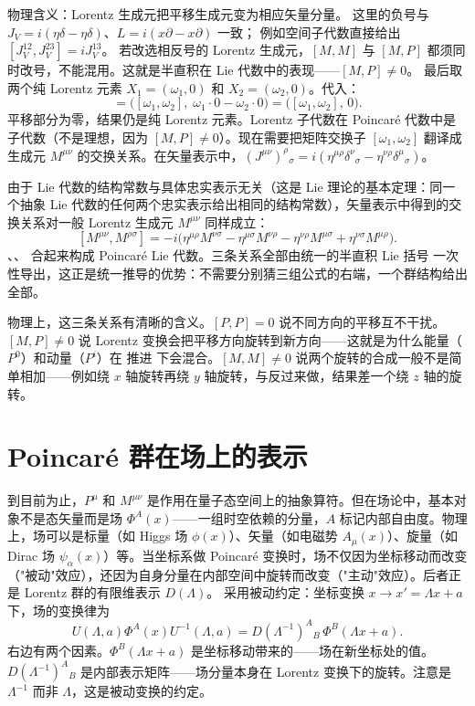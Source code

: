物理含义：Lorentz 生成元把平移生成元变为相应矢量分量。
这里的负号与 $J_V=i(\eta\delta-\eta\delta)$、$L=i(x\partial-x\partial)$ 一致；
例如空间子代数直接给出 $[J_V^{12},J_V^{23}]=iJ_V^{13}$。
若改选相反号的 Lorentz 生成元，$[M,M]$ 与 $[M,P]$ 都须同时改号，不能混用。这就是半直积在 Lie 代数中的表现——$[M,P]\neq 0$。
最后取两个纯 Lorentz 元素 $X_1=(\omega_1,0)$ 和 $X_2=(\omega_2,0)$。代入：
\begin{equation*}
[(\omega_1,0),(\omega_2,0)]=\big([\omega_1,\omega_2],\;\omega_1\cdot 0-\omega_2\cdot 0\big)=\big([\omega_1,\omega_2],\,0\big).
\end{equation*}
平移部分为零，结果仍是纯 Lorentz 元素。Lorentz 子代数在 Poincaré 代数中是子代数（不是理想，因为 $[M,P]\neq 0$）。现在需要把矩阵交换子 $[\omega_1,\omega_2]$ 翻译成生成元 $M^{\mu\nu}$ 的交换关系。在矢量表示中，$(J^{\mu\nu})^\rho{}_\sigma=i(\eta^{\mu\rho}\delta^\nu{}_\sigma-\eta^{\nu\rho}\delta^\mu{}_\sigma)$。

由于 Lie 代数的结构常数与具体忠实表示无关（这是 Lie 理论的基本定理：同一个抽象 Lie 代数的任何两个忠实表示给出相同的结构常数），矢量表示中得到的交换关系对一般 Lorentz 生成元 $M^{\mu\nu}$ 同样成立：
\begin{equation}\label{eq:ms-poincare-MM}
{
[M^{\mu\nu},M^{\rho\sigma}]=-i\big(\eta^{\mu\rho}M^{\nu\sigma}-\eta^{\mu\sigma}M^{\nu\rho}-\eta^{\nu\rho}M^{\mu\sigma}+\eta^{\nu\sigma}M^{\mu\rho}\big).
}
\end{equation}
、、 合起来构成 Poincaré Lie 代数。三条关系全部由统一的半直积 Lie 括号 一次性导出，这正是统一推导的优势：不需要分别猜三组公式的右端，一个群结构给出全部。

物理上，这三条关系有清晰的含义。$[P,P]=0$ 说不同方向的平移互不干扰。$[M,P]\neq 0$ 说 Lorentz 变换会把平移方向旋转到新方向——这就是为什么能量（$P^0$）和动量（$P^i$）在 推进 下会混合。$[M,M]\neq 0$ 说两个旋转的合成一般不是简单相加——例如绕 $x$ 轴旋转再绕 $y$ 轴旋转，与反过来做，结果差一个绕 $z$ 轴的旋转。

\section{Poincaré 群在场上的表示}
到目前为止，$P^\mu$ 和 $M^{\mu\nu}$ 是作用在量子态空间上的抽象算符。但在场论中，基本对象不是态矢量而是场 $\Phi^A(x)$——一组时空依赖的分量，$A$ 标记内部自由度。物理上，场可以是标量（如 Higgs 场 $\phi(x)$）、矢量（如电磁势 $A_\mu(x)$）、旋量（如 Dirac 场 $\psi_\alpha(x)$）等。当坐标系做 Poincaré 变换时，场不仅因为坐标移动而改变（"被动"效应），还因为自身分量在内部空间中旋转而改变（"主动"效应）。后者正是 Lorentz 群的有限维表示 $D(\Lambda)$。
采用被动约定：坐标变换 $x\to x'=\Lambda x+a$ 下，场的变换律为
\begin{equation}\label{eq:ms-poincare-field-transform}
{
U(\Lambda,a)\Phi^A(x)U^{-1}(\Lambda,a)=D(\Lambda^{-1})^A{}_B\,\Phi^B(\Lambda x+a).
}
\end{equation}
右边有两个因素。$\Phi^B(\Lambda x+a)$ 是坐标移动带来的——场在新坐标处的值。$D(\Lambda^{-1})^A{}_B$ 是内部表示矩阵——场分量本身在 Lorentz 变换下的旋转。注意是 $\Lambda^{-1}$ 而非 $\Lambda$，这是被动变换的约定。

